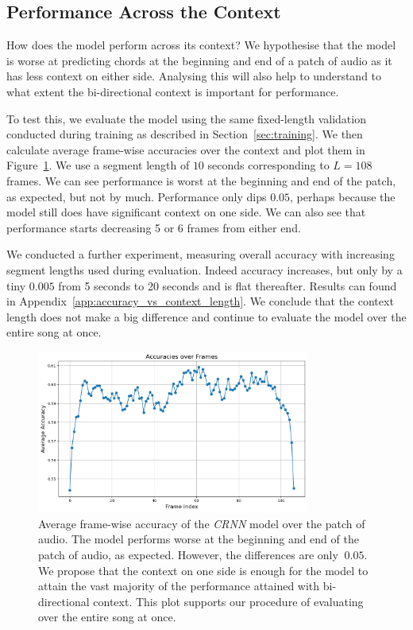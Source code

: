 \subsection{Performance Across the Context}\label{sec:crnn_performance_across_context}

How does the model perform across its context? We hypothesise that the model is worse at predicting chords at the beginning and end of a patch of audio as it has less context on either side. Analysing this will also help to understand to what extent the bi-directional context is important for performance.

To test this, we evaluate the model using the same fixed-length validation conducted during training as described in Section~\ref{sec:training}. We then calculate average frame-wise accuracies over the context and plot them in Figure~\ref{fig:crnn_context}. We use a segment length of $10$ seconds corresponding to $L=108$ frames. We can see performance is worst at the beginning and end of the patch, as expected, but not by much. Performance only dips $0.05$, perhaps because the model still does have significant context on one side. We can also see that performance starts decreasing 5 or 6 frames from either end.

We conducted a further experiment, measuring overall accuracy with increasing segment lengths used during evaluation. Indeed accuracy increases, but only by a tiny $0.005$ from 5 seconds to 20 seconds and is flat thereafter. Results can found in Appendix~\ref{app:accuracy_vs_context_length}. We conclude that the context length does not make a big difference and continue to evaluate the model over the entire song at once.

\begin{figure}[H]
    \centering
    \includegraphics[width=0.8\textwidth]{figures/accuracy_over_frames.png}
    \caption{Average frame-wise accuracy of the \emph{CRNN} model over the patch of audio. The model performs worse at the beginning and end of the patch of audio, as expected. However, the differences are only $~0.05$. We propose that the context on one side is enough for the model to attain the vast majority of the performance attained with bi-directional context. This plot supports our procedure of evaluating over the entire song at once. }\label{fig:crnn_context}
\end{figure}

